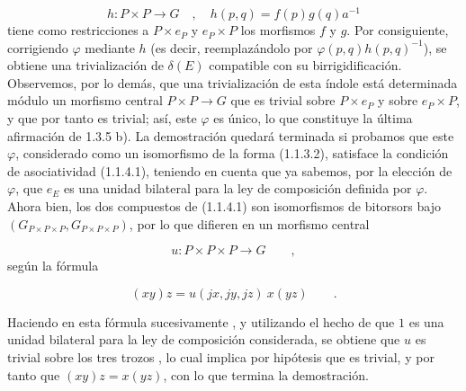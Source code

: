 \begin{equation*}
h : P \times P \longrightarrow G \quad , \quad h(p,q) = f(p)g(q)a^{-1}
\end{equation*}
tiene como restricciones a $P \times e_P$ y $e_P \times P$ los
morfismos $f$ y $g$. Por consiguiente, corrigiendo $\varphi$ mediante
$h$ (es decir, reemplazándolo por $\varphi(p,q)h(p,q)^{-1}$), se
obtiene una trivialización de $\delta(E)$ compatible con su
birrigidificación. Observemos, por lo demás, que una trivialización de
esta índole está determinada módulo un morfismo central
$P \times P \longrightarrow G$ que es trivial sobre $P \times e_P$
y sobre $e_P \times P$, y que por tanto es trivial; así, este
$\varphi$ es único, lo que constituye la última afirmación de 1.3.5 b).
La demostración quedará terminada si probamos que este $\varphi$,
considerado como un isomorfismo de la forma (1.1.3.2), satisface la
condición de asociatividad (1.1.4.1), teniendo en cuenta que ya sabemos,
por la elección de $\varphi$, que $e_E$ es una unidad bilateral para la
ley de composición definida por $\varphi$. Ahora bien, los dos
compuestos de (1.1.4.1) son isomorfismos de bitorsors bajo
$(G_{P \times P \times P} , G_{P \times P \times P})$, por lo que
difieren en un morfismo central

\begin{equation*}
u : P \times P \times P \longrightarrow G \qquad ,
\end{equation*}
según la fórmula

\begin{equation*}
(xy)z = u(jx,jy,jz) \ x(yz) \qquad .
\end{equation*}


Haciendo en esta fórmula sucesivamente
, y utilizando el hecho de que $1$ es una
unidad bilateral para la ley de composición considerada, se obtiene que
$u$ es trivial sobre los tres trozos
, lo cual implica por
hipótesis que es trivial, y por tanto que $(xy)z = x(yz)$, con lo que
termina la demostración.
